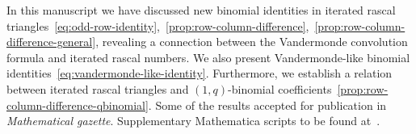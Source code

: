 In this manuscript we have discussed new binomial identities in iterated rascal
triangles~\eqref{eq:odd-row-identity},~\eqref{prop:row-column-difference},~\eqref{prop:row-column-difference-general},
revealing a connection between the Vandermonde convolution formula and iterated rascal numbers.
We also present Vandermonde-like binomial identities~\eqref{eq:vandermonde-like-identity}.
Furthermore, we establish a relation between iterated rascal triangles
and $(1,q)$-binomial coefficients~\eqref{prop:row-column-difference-qbinomial}.
Some of the results accepted for publication in \textit{Mathematical gazette}.
Supplementary Mathematica scripts to be found at~\cite{kolosov2024identities}.
